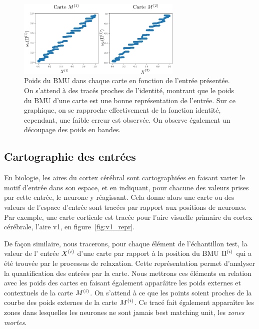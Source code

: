 \begin{figure}
    \centering
    \includegraphics[width=0.7\textwidth]{w_x.pdf}
    \caption{Poids du BMU dans chaque carte en fonction de l'entrée présentée. On s'attend à des tracés proches de l'identité, montrant que le poids du BMU d'une carte est une bonne représentation de l'entrée. Sur ce graphique, on se rapproche effectivement de la fonction identité, cependant, une faible erreur est observée. On observe également un découpage des poids en bandes.\label{fig:erreur}}
\end{figure}


\subsection{Cartographie des entrées}

En biologie, les aires du cortex cérébral sont cartographiées en faisant varier le motif d'entrée dans son espace, et en indiquant, pour chacune des valeurs prises par cette entrée, le neurone y réagissant. Cela donne alors une carte ou des valeurs de l'espace d'entrée sont tracées par rapport aux positions de neurones.
Par exemple, une carte corticale est tracée pour l'aire visuelle primaire du cortex cérébrale, l'aire v1, en figure~\ref{fig:v1_repr}.

De façon similaire, nous tracerons, pour chaque élément de l'échantillon test, la valeur de l' entrée $X^{({i})}$ d'une carte par rapport à la position du BMU $\Pi^{({i})}$ qui a été trouvée par le processus de relaxation.
Cette représentation permet d'analyser la quantification des entrées par la carte. Nous mettrons ces éléments en relation avec les poids des cartes en faisant également apparâitre les poids externes et contextuels de la carte $M^{({i})}$.
On s'attend à ce que les points soient proches de la courbe des poids externes de la carte $M^{({i})}$.
Ce tracé fait également apparaître les zones dans lesquelles les neurones ne sont jamais best matching unit, les \emph{zones mortes}.

